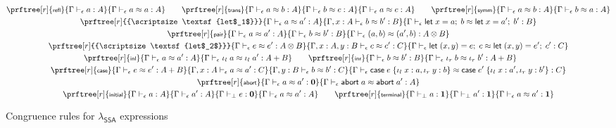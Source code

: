 \documentclass[acmsmall,screen,review]{acmart}
\newcommand{\mb}[1]{\ensuremath{\mathbf{#1}}}
\newcommand{\ms}[1]{\ensuremath{\mathsf{#1}}}
\newcommand{\lto}{:}
\newcommand{\linl}[1]{\iota_l\;{#1}}
\newcommand{\linr}[1]{\iota_r\;{#1}}
\newcommand{\labort}[1]{\ms{abort}\;{#1}}
\newcommand{\letexpr}[3]{\ensuremath{\ms{let}\;#1 = #2;\;#3}}
\newcommand{\caseexpr}[5]{\ms{case}\;#1\;\{\linl{#2} \lto #3, \linr{#4} \lto #5\}}
\newcommand{\bhyp}[2]{#1 : #2}
\newcommand{\rle}[1]{{\scriptsize\textsf{#1}}}
\newcommand{\hasty}[4]{#1 \vdash_{#2} #3: {#4}}
\newcommand{\teqv}{\approx}
\newcommand{\tmeq}[5]{#1 \vdash_{#2} #3 \teqv #4 : {#5}}
\newcommand{\isotopessa}{\(\lambda_{\ms{SSA}}\)}
\begin{document}
\begin{figure}
  \begin{gather*}
    \prftree[r]{\rle{refl}}{\hasty{\Gamma}{\epsilon}{a}{A}}{\tmeq{\Gamma}{\epsilon}{a}{a}{A}} \qquad
    \prftree[r]{\rle{trans}}
      {\tmeq{\Gamma}{\epsilon}{a}{b}{A}}
      {\tmeq{\Gamma}{\epsilon}{b}{c}{A}} 
      {\tmeq{\Gamma}{\epsilon}{a}{c}{A}} \qquad
    \prftree[r]{\rle{symm}}
      {\tmeq{\Gamma}{\epsilon}{a}{b}{A}}
      {\tmeq{\Gamma}{\epsilon}{b}{a}{A}}
    \\
    \prftree[r]{\rle{let$_1$}}
      {\tmeq{\Gamma}{\epsilon}{a}{a'}{A}}
      {\tmeq{\Gamma, \bhyp{x}{A}}{\epsilon}{b}{b'}{B}}
      {\tmeq{\Gamma}{\epsilon}{\letexpr{x}{a}{b}}{\letexpr{x}{a'}{b'}}{B}} 
    \\
    \prftree[r]{\rle{pair}}
      {\tmeq{\Gamma}{\epsilon}{a}{a'}{A}}
      {\tmeq{\Gamma}{\epsilon}{b}{b'}{B}}
      {\tmeq{\Gamma}{\epsilon}{(a, b)}{(a', b)}{A \otimes B}}
    \\
    \prftree[r]{\rle{let$_2$}}
      {\tmeq{\Gamma}{\epsilon}{e}{e'}{A \otimes B}}
      {\tmeq{\Gamma, \bhyp{x}{A}, \bhyp{y}{B}}{\epsilon}{c}{c'}{C}}
      {\tmeq{\Gamma}{\epsilon}{\letexpr{(x, y)}{e}{c}}{\letexpr{(x, y)}{e'}{c'}}{C}}
    \\
    \prftree[r]{\rle{inl}}
      {\tmeq{\Gamma}{\epsilon}{a}{a'}{A}}
      {\tmeq{\Gamma}{\epsilon}{\linl{a}}{\linl{a'}}{A + B}} \qquad
    \prftree[r]{\rle{inr}}
      {\tmeq{\Gamma}{\epsilon}{b}{b'}{B}}
      {\tmeq{\Gamma}{\epsilon}{\linr{b}}{\linr{b'}}{A + B}} \qquad
    \\
    \prftree[r]{\rle{case}}
      {\tmeq{\Gamma}{\epsilon}{e}{e'}{A + B}}
      {\tmeq{\Gamma, \bhyp{x}{A}}{\epsilon}{a}{a'}{C}}
      {\tmeq{\Gamma, \bhyp{y}{B}}{\epsilon}{b}{b'}{C}}
      {\tmeq{\Gamma}{\epsilon}{\caseexpr{e}{x}{a}{y}{b}}{\caseexpr{e'}{x}{a'}{y}{b'}}{C}}
    \\
    \prftree[r]{\rle{abort}}
      {\tmeq{\Gamma}{\epsilon}{a}{a'}{\mb{0}}}
      {\tmeq{\Gamma}{\epsilon}{\labort{a}}{\labort{a'}}{A}}
    \\
    \prftree[r]{\rle{initial}} 
      {\hasty{\Gamma}{\epsilon}{a}{A}}
      {\hasty{\Gamma}{\epsilon}{a'}{A}}
      {\hasty{\Gamma}{\bot}{e}{\mb{0}}}
      {\tmeq{\Gamma}{\epsilon}{a}{a'}{A}}
      \qquad
    \prftree[r]{\rle{terminal}}
      {\hasty{\Gamma}{\bot}{a}{\mb{1}}}
      {\hasty{\Gamma}{\bot}{a'}{\mb{1}}}
      {\tmeq{\Gamma}{\epsilon}{a}{a'}{\mb{1}}}
    \end{gather*}
  \caption{Congruence rules for \isotopessa{} expressions}
  \Description{}
  \label{fig:ssa-expr-congr-rules}
\end{figure}
\end{document}
